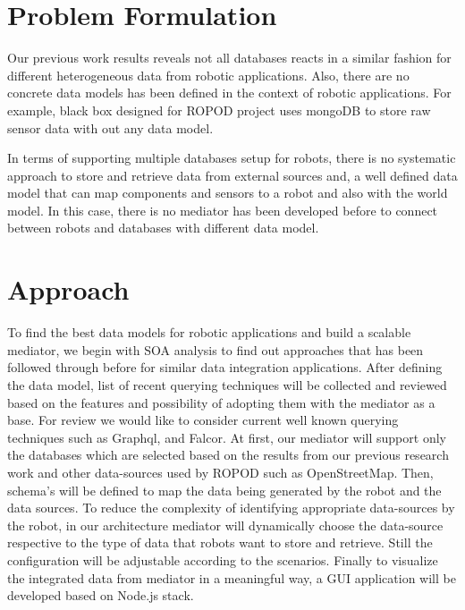 \documentclass[12pt]{article}
\begin{document}
 

\section{Problem Formulation}

Our previous work results reveals not all databases reacts in a similar fashion for different heterogeneous data from robotic applications. Also, there are no concrete data models has been defined in the context of robotic applications. For example, black box designed for ROPOD project uses mongoDB to store raw sensor data with out any data model. 


In terms of supporting multiple databases setup for robots,  there is no systematic approach to store and retrieve data from external sources and, a well defined data model that can map components and sensors to a robot and also with the world model.
In this case, there is no mediator has been developed before to connect between robots and databases with different data model.


\section{Approach}

To find the best data models for robotic applications and build a scalable mediator, we begin with SOA analysis to find out approaches that has been followed through before for similar data integration applications. After defining the data model, list of recent querying techniques will be collected and reviewed based on the features and possibility of adopting them with the mediator as a base. For review we would like to consider current well known querying techniques such as Graphql, and Falcor. At first, our mediator will support only the databases which are selected based on the results from our previous research work \cite{ravichandranworkbench} and other data-sources used by ROPOD such as OpenStreetMap. Then, schema's will be defined to map the data being generated by the robot and the data sources. To reduce the complexity of identifying appropriate data-sources by the robot, in our architecture mediator will dynamically choose the data-source respective to the type of data that robots want to store and retrieve. Still the configuration will be adjustable according to the scenarios. Finally to visualize the integrated data from mediator in a meaningful way, a GUI application will be developed based on Node.js stack.
\end{document}
